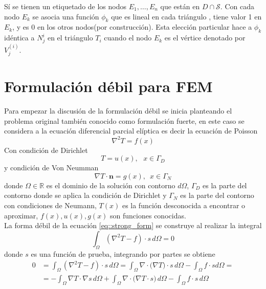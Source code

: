 \documentclass[a4paper]{article}
\begin{document}
Sí se tienen un etiquetado de los nodos $E_1,\hdots,E_n$ que están en $D\cap \mathcal{S}$. Con cada nodo $E_k$ se asocia una función $\phi_k$ que es lineal en cada triángulo , tiene valor 1 en $E_k$, y es $0$ en los otros nodos(por construcción). Esta elección particular hace a $\phi_k$ idéntica a $N_j^{i}$ en el triángulo $T_i$ cuando el nodo $E_k$ es el vértice denotado por $V_j^{(i)}$.

\section{Formulación débil para FEM}
Para empezar la discusión de la formulación débil se inicia planteando el problema original también conocido como formulación fuerte, en este caso se considera a la ecuación diferencial parcial elíptica es decir la ecuación de Poisson
\begin{equation}\label{eq::strong_form}
\nabla^2 T= f(x)
\end{equation}
Con condición de Dirichlet 
\begin{equation}
T=u(x), \,\,\,\,x\in \Gamma_D
\end{equation}
y condición de Von Neumman
\begin{equation}
\nabla T \cdot \mathbf{n}=g(x),\,\,\,x\in \Gamma_N
\end{equation}
donde $\Omega\in \mathbb{R}$ es el dominio de la solución con contorno $d\Omega$, $\Gamma_D$ es la parte del contorno donde se aplica la condición de Dirichlet y $\Gamma_N$ es la parte del contorno con condiciones de Neumann, $T(x)$ es la función desconocida a encontrar o aproximar, $f(x), u(x), g(x)$ son funciones conocidas.\\
La forma débil de la ecuación \ref{eq::strong_form} se construye al realizar la integral
\begin{equation}
\int_{\Omega}(\nabla^2 T -f)\cdot s\, d\Omega=0
\end{equation}
donde $s$ es una función de prueba, integrando por partes se obtiene
\begin{equation}
\begin{aligned}
0&=\int_{\Omega}(\nabla^2 T -f)\cdot s\, d\Omega=\int_{\Omega}\nabla\cdot\big( \nabla T \big)\cdot s\, d\Omega-\int_{\Omega}f\cdot s d\Omega=\\
&=-\int_{\Omega}\nabla T \cdot \nabla s \,d\Omega + \int_{\Omega}\nabla\cdot\big(\nabla T \cdot s  \big)\,d\Omega-\int_{\Omega} f\cdot s\, d\Omega
\end{aligned}
\end{equation}
\end{document}
